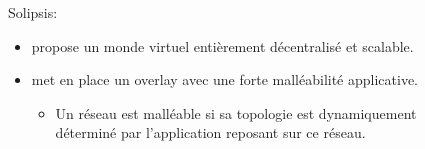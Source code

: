 \documentclass{beamer}
\begin{document}
\begin{frame}
\begin{columns}
\begin{column}{4cm}
\begin{figure}
        \label{Propa_Algo}
        \end{figure}
        \end{column}
        \end{columns}
  \end{frame}

  \begin{frame}\addtocounter{framenumber}{-1}
        \begin{columns}
          \begin{column}{6cm}
        Solipsis:\\
        \begin{itemize}
                \item propose un monde virtuel entièrement décentralisé et scalable.\\
                \item met en place un overlay avec une forte malléabilité applicative.\\
                \tiny{
                        \begin{itemize}
                                \item Un réseau est malléable si sa topologie est dynamiquement déterminé par l'application reposant sur ce réseau.\\
                        \end{itemize}
                }
        \end{itemize}
        \end{column}
        \begin{column}{4cm}
        \begin{figure}

\end{figure}
\end{column}
\end{columns}
\end{frame}
\end{document}
